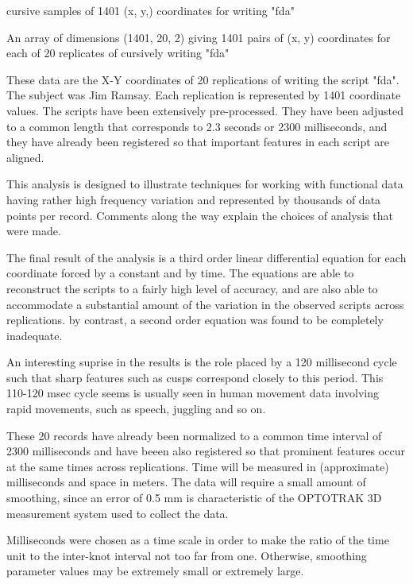 \documentclass{article}
\begin{document}
\begin{Description} cursive samples of 1401 (x, y,) coordinates for writing "fda"
\end{Description}
\begin{Format}\relax
An array of dimensions (1401, 20, 2) giving 1401 pairs of (x, y)
coordinates for each of 20 replicates of cursively writing "fda"
\end{Format}
\begin{Details}\relax
These data are the X-Y coordinates of 20 replications of writing
the script "fda".  The subject was Jim Ramsay.  Each replication
is represented by 1401 coordinate values.  The scripts have been 
extensively pre-processed.  They have been adjusted to a common
length that corresponds to 2.3 seconds or 2300 milliseconds, and
they have already been registered so that important features in
each script are aligned.

This analysis is designed to illustrate techniques for working
with functional data having rather high frequency variation and
represented by thousands of data points per record.  Comments
along the way explain the choices of analysis that were made.

The final result of the analysis is a third order linear 
differential equation for each coordinate forced by a 
constant and by time.  The equations are able to reconstruct
the scripts to a fairly high level of accuracy, and are also
able to accommodate a substantial amount of the variation in
the observed scripts across replications.  by contrast, a 
second order equation was found to be completely inadequate.

An interesting suprise in the results is the role placed by
a 120 millisecond cycle such that sharp features such as cusps
correspond closely to this period.  This 110-120 msec cycle
seems is usually seen in human movement data involving rapid
movements, such as speech, juggling and so on.

These 20 records have already been normalized to a common time
interval of 2300 milliseconds and have beeen also registered so that
prominent features occur at the same times across replications.  Time
will be measured in (approximate) milliseconds and space in meters.
The data will require a small amount of smoothing, since an error of
0.5 mm is characteristic of the OPTOTRAK 3D measurement system used to
collect the data.

Milliseconds were chosen as a time scale in order to make the ratio of
the time unit to the inter-knot interval not too far from one.
Otherwise, smoothing parameter values may be extremely small or
extremely large.


\end{Details}
\end{document}
